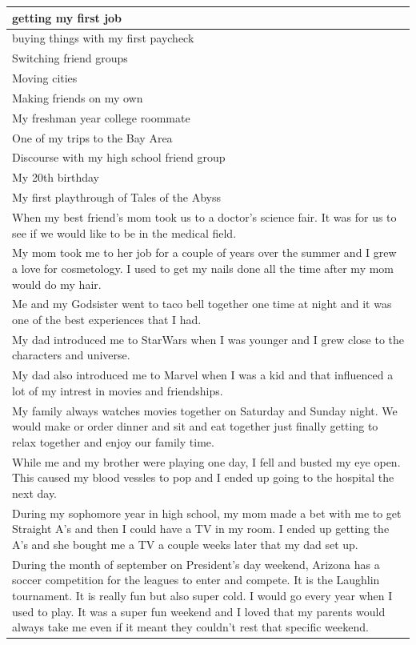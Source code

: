 \documentclass[
  .7em,
  letterpaper,
  DIV=11,
  numbers=noendperiod]{scrartcl}
\begin{document}
\begin{table}
\begin{tabular}{l}
\hline
getting my first job\\
\hline
buying things with my first paycheck\\
\hline
Switching friend groups\\
\hline
Moving cities\\
\hline
Making friends on my own\\
\hline
My freshman year college roommate\\
\hline
One of my trips to the Bay Area\\
\hline
Discourse with my high school friend group\\
\hline
My 20th birthday\\
\hline
My first playthrough of Tales of the Abyss\\
\hline
When my best friend's mom took us to a doctor's science fair. It was for us to see if we would like to be in the medical field.\\
\hline
My mom took me to her job for a couple of years over the summer and I grew a love for cosmetology. I used to get my nails done all the time after my mom would do my hair.\\
\hline
Me and my Godsister went to taco bell together one time at night and it was one of the best experiences that I had.\\
\hline
My dad introduced me to StarWars when I was younger and I grew close to the characters and universe.\\
\hline
My dad also introduced me to Marvel when I was a kid and that influenced a lot of my intrest in movies and friendships.\\
\hline
My family always watches movies together on Saturday and Sunday night. We would make or order dinner and sit and eat together just finally getting to relax together and enjoy our family time.\\
\hline
While me and my brother were playing one day, I fell and busted my eye open. This caused my blood vessles to pop and I ended up going to the hospital the next day.\\
\hline
During my sophomore year in high school, my mom made a bet with me to get Straight A's and then I could have a TV in my room. I ended up getting the A's and she bought me a TV a couple weeks later that my dad set up.\\
\hline
During the month of september on President's day weekend, Arizona has a soccer competition for the leagues to enter and compete. It is the Laughlin tournament. It is really fun but also super cold. I would go every year when I used to play. It was a super fun weekend and I loved that my parents would always take me even if it meant they couldn't rest that specific weekend.\\

\end{tabular}
\end{table}
\end{document}
